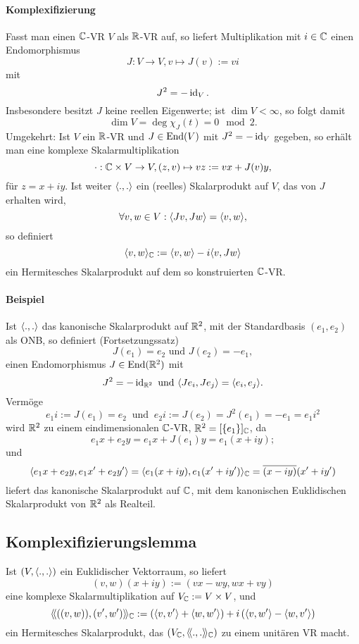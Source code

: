\paragraph{Komplexifizierung}
	Fasst man einen $ \mathbb{C} $-VR $ V $ als $ \mathbb{R} $-VR auf, so liefert Multiplikation mit $ i\in \mathbb{C} $ einen Endomorphismus
		\[ J:V\to V, v\mapsto J(v):= vi \] %
	mit
		\[ J^2 = -\operatorname{id}_V. \]
	Insbesondere besitzt $ J $ keine reellen Eigenwerte;
	ist $ \dim V < \infty $, so folgt damit
		\[ \dim V = \deg{\chi_J}(t) = 0 \mod 2. \]
	Umgekehrt: Ist $ V $ ein $ \mathbb{R} $-VR und $ J\in \operatorname{End}(V) $ mit $ J^2 = -\operatorname{id}_V $ gegeben, so erhält man eine komplexe Skalarmultiplikation
		\[ \cdot :\mathbb{C}\times V \to V, (z,v)\mapsto vz := vx+J(v)y, \]
	für $ z = x+iy $.
	Ist weiter $ \langle .,. \rangle $ ein (reelles) Skalarprodukt auf $ V $, das von $ J $ erhalten wird, 
		\[ \forall v,w\in V: \langle Jv,Jw \rangle = \langle v,w \rangle, \]
	so definiert
		\[ \langle v,w \rangle_{\mathbb{C}} := \langle v,w \rangle -i \langle v,Jw \rangle \]
	ein Hermitesches Skalarprodukt auf dem so konstruierten $ \mathbb{C} $-VR.

\paragraph{Beispiel}\label{JDrehung}
	Ist $ \langle .,. \rangle $ das kanonische Skalarprodukt auf $ \mathbb{R}^2 $, mit der Standardbasis $ (e_1,e_2) $ als ONB, so definiert (Fortsetzungssatz)
		\[ J(e_1) = e_2 \text{ und } J(e_2) = -e_1, \]
	einen Endomorphismus $ J\in\operatorname{End}(\mathbb{R}^2) $ mit
		\[ J^2 = -\operatorname{id}_{\mathbb{R}^2} \text{ und } \langle Je_i,Je_j \rangle = \langle e_i,e_j \rangle. \]
	Vermöge
		\[ e_1i := J(e_1) = e_2\ \text{ und }\ e_2i := J(e_2) = J^2(e_1) = -e_1 = e_1 i^2 \]
	wird $ \mathbb{R}^2 $ zu einem eindimensionalen $ \mathbb{C} $-VR, $ \mathbb{R}^2 = [\{e_1\}]_{\mathbb{C}} $, da
		\[ e_1x+e_2y = e_1x+J(e_1)y = e_1 (x+iy); \]
	und
		\[ \langle e_1x+e_2y,e_1x'+e_2y' \rangle = \langle e_1(x+iy),e_1(x'+iy') \rangle_{\mathbb{C}} = \overline{(x-iy)}(x'+iy') \]
	liefert das kanonische Skalarprodukt auf $ \mathbb{C} $, mit dem kanonischen Euklidischen Skalarprodukt von $ \mathbb{R}^2 $ als Realteil.

\subsection{Komplexifizierungslemma}
\begin{Lemma}[Komplexifizierungslemma]
	Ist $ (V,\langle .,. \rangle) $ ein Euklidischer Vektorraum, so liefert
		\[ (v,w)(x+iy) := (vx-wy,wx+vy) \]
	eine komplexe Skalarmultiplikation auf $ V_{\mathbb{C}} := V\times V $, und
		\[ \langle\! \langle ((v,w)),(v',w') \rangle\! \rangle_{\mathbb{C}} := \left(\langle v,v' \rangle+\langle w,w' \rangle \right)+i\left(\langle v,w' \rangle-\langle w,v' \rangle \right) \]
	ein Hermitesches Skalarprodukt, das $ (V_{\mathbb{C}},\langle\! \langle .,. \rangle\! \rangle_{\mathbb{C}}) $ zu einem unitären VR macht.
\end{Lemma}

